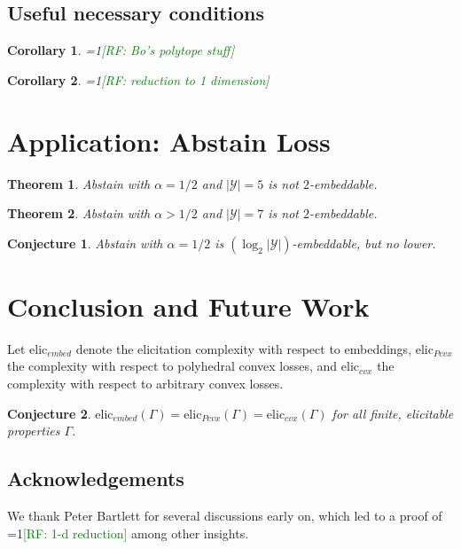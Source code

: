 \documentclass[11pt]{article}
\newcommand{\Comments}{1}
\newcommand{\mynote}[2]{\ifnum\Comments=1\textcolor{#1}{#2}\fi}
\newcommand{\raf}[1]{\mynote{green}{[RF: #1]}}
\newcommand{\Y}{\mathcal{Y}}
\newtheorem{theorem}{Theorem}
\newtheorem{corollary}{Corollary}
\newtheorem{conjecture}{Conjecture}
\begin{document}
\subsection{Useful necessary conditions}

\begin{corollary}
  \raf{Bo's polytope stuff}
\end{corollary}

\begin{corollary}
  \raf{reduction to 1 dimension}
\end{corollary}

\section{Application: Abstain Loss}

\begin{theorem}
  Abstain with $\alpha=1/2$ and $|\Y|=5$ is not $2$-embeddable.
\end{theorem}

\begin{theorem}
  Abstain with $\alpha > 1/2$ and $|\Y|=7$ is not $2$-embeddable.
\end{theorem}

\begin{conjecture}
  Abstain with $\alpha=1/2$ is $(\log_2 |\Y|)$-embeddable, but no lower.
\end{conjecture}

\section{Conclusion and Future Work}

Let $\mathrm{elic}_{embed}$ denote the elicitation complexity with respect to embeddings, $\mathrm{elic}_{Pcvx}$ the complexity with respect to polyhedral convex losses, and $\mathrm{elic}_{cvx}$ the complexity with respect to arbitrary convex losses.

\begin{conjecture}
  $\mathrm{elic}_{embed}(\Gamma) = \mathrm{elic}_{Pcvx}(\Gamma) = \mathrm{elic}_{cvx}(\Gamma)$ for all finite, elicitable properties $\Gamma$.
\end{conjecture}

\subsection*{Acknowledgements}
We thank Peter Bartlett for several discussions early on, which led to a proof of \raf{1-d reduction} among other insights.
\end{document}
